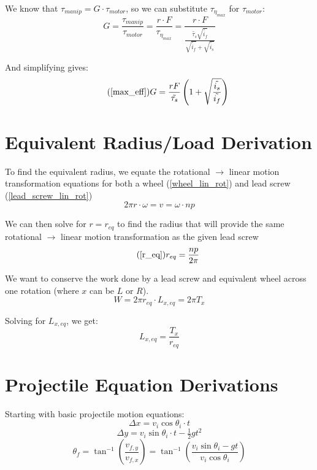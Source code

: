 \documentclass[11pt,a4paper,titlepage]{article}
\begin{document}
	We know that $\tau_{manip} = G \cdot \tau_{motor}$, so we can substitute $\tau_{\eta_{max}}$ for $\tau_{motor}$:
	\begin{equation}
		G = \frac{\tau_{manip}}{\tau_{motor}} = \frac{r \cdot F}{\tau_{\eta_{max}}} = \frac{r \cdot F}{\frac{\tilde{\tau_s} \sqrt{\tilde{i_f}}}{\sqrt{\tilde{i_f}} + \sqrt{\tilde{i_s}}}}
	\end{equation}
	
	And simplifying gives:
	\begin{equation} \tag{\ref*{max_eff}}
		G = \frac{r F}{\tilde{\tau_s}} \left( 1 + \sqrt{\frac{\tilde{i_s}}{\tilde{i_f}}} \right)
	\end{equation}
	
	\bigskip
	\section{Equivalent Radius/Load Derivation} \label{appendixB}
	To find the equivalent radius, we equate the rotational $\to$ linear motion transformation equations for both a wheel (\ref{wheel_lin_rot}) and lead screw (\ref{lead_screw_lin_rot})
	\begin{equation}
		2 \pi r \cdot \omega = v = \omega \cdot n p
	\end{equation}
	
	We can then solve for $r = r_{eq}$ to find the radius that will provide the same rotational $\to$ linear motion transformation as the given lead screw
	\begin{equation} \tag{\ref*{r_eq}}
		r_{eq} = \frac{n p}{2 \pi}
	\end{equation}
	
	We want to conserve the work done by a lead screw and equivalent wheel across one rotation (where $x$ can be $L$ or $R$). 
	\begin{equation}
		W = 2 \pi r_{eq} \cdot L_{x,eq} = 2 \pi T_x
	\end{equation}
	
	Solving for $L_{x,eq}$, we get:
	\begin{equation}
		L_{x,eq} = \frac{T_x}{r_{eq}}
	\end{equation}
	
	\newpage
	\section{Projectile Equation Derivations} \label{appendixC}
	Starting with basic projectile motion equations:
	\begin{equation} \label{projX}
		\Delta x = v_i \cos \theta_i \cdot t
	\end{equation}
	\begin{equation} \label{projY}
		\Delta y = v_i \sin \theta_i \cdot t - \tfrac{1}{2} g t^2
	\end{equation}
	\begin{equation} \label{theta_f}
		\theta_f = \tan^{-1} \left( \frac{v_{f,y}}{v_{f,x}} \right) = \tan^{-1} \left( \frac{v_i \sin \theta_i - g t}{v_i \cos \theta_i} \right)
	\end{equation}
	
\end{document}
